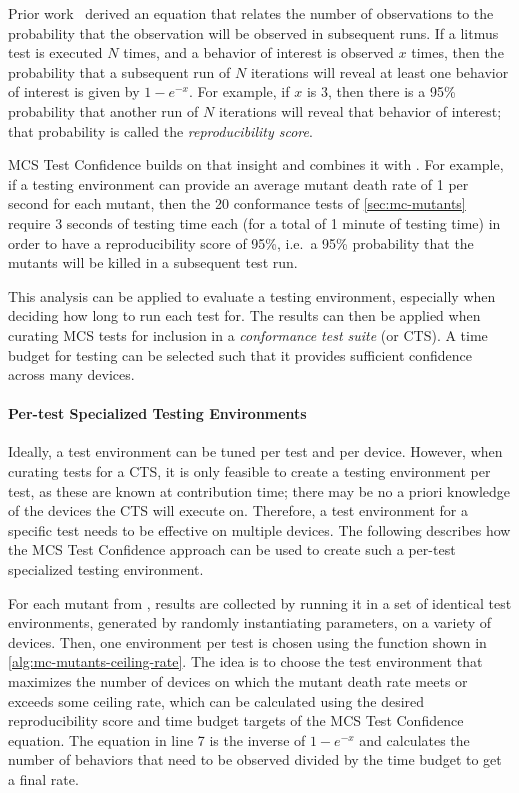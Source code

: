 Prior work~\cite{kirkham2020foundations} derived an equation that relates the number of observations to the probability that the observation will be observed in subsequent runs. If a litmus test is executed $N$ times, and a behavior of interest is observed $x$ times, then the probability that a subsequent run of $N$ iterations will reveal at least one behavior of interest is given by $1 - e^{-x}$. For example, if $x$ is $3$, then there is a 95\% probability that another run of $N$ iterations will reveal that behavior of interest; that probability is called the \textit{reproducibility score}.

MCS Test Confidence builds on that insight and combines it with \sys. For example, if a testing environment can provide an average mutant death rate of 1 per second for each mutant, then the 20 conformance tests of \mysec\ref{sec:mc-mutants} require 3 seconds of testing time each (for a total of 1 minute of testing time) in order to have a reproducibility score of 95\%, i.e.\ a 95\% probability that the mutants will be killed in a subsequent test run.

This analysis can be applied to evaluate a testing environment, especially when deciding how long to run each test for. The results can then be applied when curating MCS tests for inclusion in a \textit{conformance test suite} (or CTS). A time budget for testing can be selected such that it provides sufficient confidence across many devices.

\paragraph{Per-test Specialized Testing Environments} Ideally, a test environment can be tuned
per test and per device. However, when curating tests for a CTS, it is only feasible to create a testing environment per test, as these are known at contribution time; there may be no a priori knowledge of the devices the CTS will execute on. Therefore, a test environment for a specific test needs to be effective on multiple devices. The following describes how the MCS Test Confidence approach can be used to create such a per-test specialized testing environment.

For each mutant from \sys, results are collected by running it in a set of identical test environments, generated by randomly instantiating parameters, on a variety of devices. Then, one environment per test is chosen using the function shown in \myalg\ref{alg:mc-mutants-ceiling-rate}. The idea is to choose the test environment that maximizes the number of devices on which the mutant death rate meets or exceeds some ceiling rate, which can be calculated using the desired reproducibility score and time budget targets of the MCS Test Confidence equation. The equation in line 7 is the inverse of $1 - e^{-x}$ and calculates the number of behaviors that need to be observed divided by the time budget to get a final rate.

